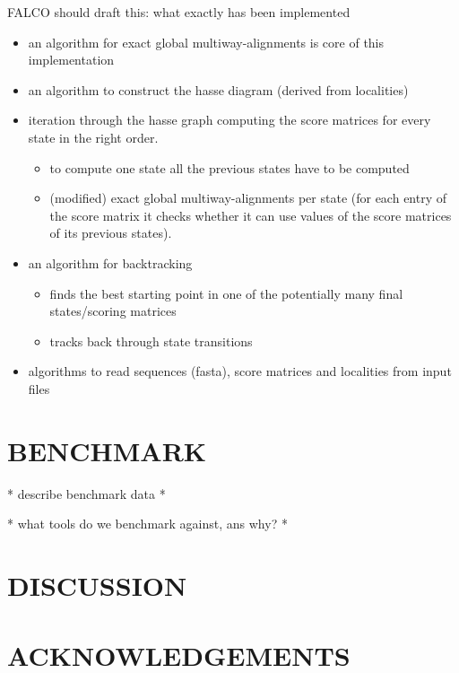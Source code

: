 \documentclass[a4paper,10pt]{article}
\newcommand{\TODO}[1]{\begingroup\color{red}#1\endgroup}
\begin{document}
\TODO{FALCO should draft this: what exactly has been implemented} 
\begin{itemize}
    \item an algorithm for exact global multiway-alignments is core of this implementation
    \item an algorithm to construct the hasse diagram (derived from localities)
    \item iteration through the hasse graph computing the score matrices for every state in the right order. 
    \begin{itemize}
        \item to compute one state all the previous states have to be computed
        \item (modified) exact global multiway-alignments per state (for each entry of the score matrix it checks whether it can use values of the score matrices of its previous states).
    \end{itemize}
    \item an algorithm for backtracking
    \begin{itemize}
        \item finds the best starting point in one of the potentially many final states/scoring matrices
        \item tracks back through state transitions 
    \end{itemize}
    \item algorithms to read sequences (fasta), score matrices and localities from input files
\end{itemize}

\section{\uppercase{Benchmark}}

\TODO{* describe benchmark data *}

\cite{oxbench}

\cite{balibase}

\TODO{* what tools do we benchmark against, ans why? *} 


\section{\uppercase{Discussion}}
\section*{\uppercase{Acknowledgements}}
\end{document}
